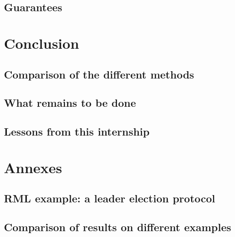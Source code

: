 \documentclass[11pt,a4paper,oldfontcommands]{memoir}
\begin{document}
    \section{Guarantees}

\chapter{Conclusion}

    \section{Comparison of the different methods}

    \section{What remains to be done}

    \section{Lessons from this internship}

\chapter{Annexes}

    \section{RML example: a leader election protocol}

    \section{Comparison of results on different examples}



\end{document}
